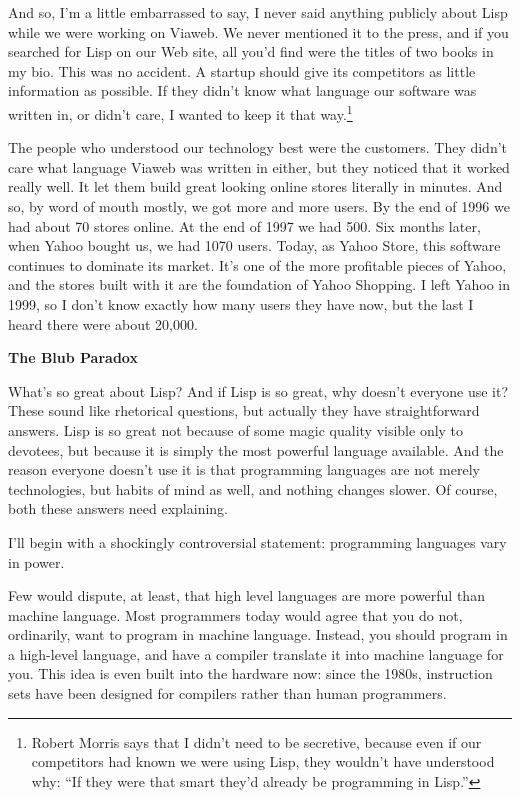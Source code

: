 And so, I'm a little embarrassed to say, I never said anything publicly
about Lisp while we were working on Viaweb. We never mentioned it to the
press, and if you searched for Lisp on our Web site, all you'd find were
the titles of two books in my bio. This was no accident. A startup
should give its competitors as little information as possible. If they
didn't know what language our software was written in, or didn't care, I
wanted to keep it that way.\footnote{Robert Morris says that I didn't need to be secretive, because
even if our competitors had known we were using Lisp, they wouldn't have
understood why: ``If they were that smart they'd already be programming
in Lisp.''}

The people who understood our technology best were the customers. They
didn't care what language Viaweb was written in either, but they noticed
that it worked really well. It let them build great looking online
stores literally in minutes. And so, by word of mouth mostly, we got
more and more users. By the end of 1996 we had about 70 stores online.
At the end of 1997 we had 500. Six months later, when Yahoo bought us,
we had 1070 users. Today, as Yahoo Store, this software continues to
dominate its market. It's one of the more profitable pieces of Yahoo,
and the stores built with it are the foundation of Yahoo Shopping. I
left Yahoo in 1999, so I don't know exactly how many users they have
now, but the last I heard there were about 20,000.

\textbf{The Blub Paradox}

What's so great about Lisp? And if Lisp is so great, why doesn't
everyone use it? These sound like rhetorical questions, but actually
they have straightforward answers. Lisp is so great not because of some
magic quality visible only to devotees, but because it is simply the
most powerful language available. And the reason everyone doesn't use it
is that programming languages are not merely technologies, but habits of
mind as well, and nothing changes slower. Of course, both these answers
need explaining.

I'll begin with a shockingly controversial statement: programming
languages vary in power.

Few would dispute, at least, that high level languages are more powerful
than machine language. Most programmers today would agree that you do
not, ordinarily, want to program in machine language. Instead, you
should program in a high-level language, and have a compiler translate
it into machine language for you. This idea is even built into the
hardware now: since the 1980s, instruction sets have been designed for
compilers rather than human programmers.

